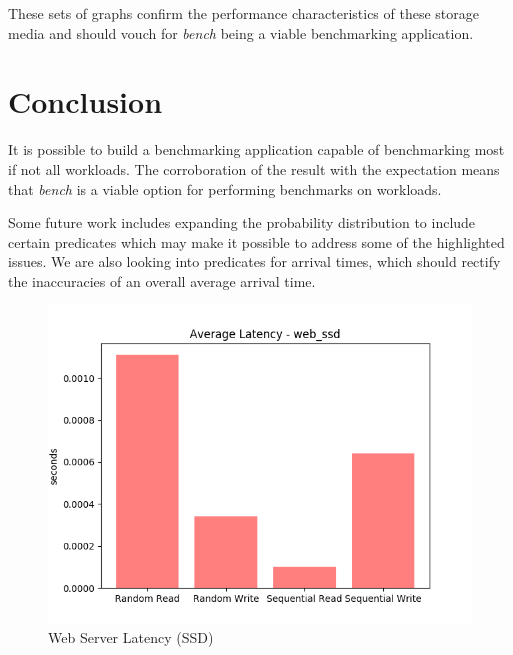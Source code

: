 \documentclass[10pt, author, twocolumn]{article}
\begin{document}
These sets of graphs confirm the performance characteristics of these storage media and should vouch for \textit{bench} being a viable benchmarking application.

\section{Conclusion}
It is possible to build a benchmarking application capable of benchmarking most if not all workloads. The corroboration of the result with the expectation means that \textit{bench} is a viable option for performing benchmarks on workloads. 

Some future work includes expanding the probability distribution to include certain predicates which may make it possible to address some of the highlighted issues. We are also looking into predicates for arrival times, which should rectify the inaccuracies of an overall average arrival time.

\newpage
\begin{figure}[t!]
    \includegraphics[scale=0.5]{../graphs/web_ssd-lat.png}
    \caption{Web Server Latency (SSD)}
    \label{fig:ssd_web_lat}
\end{figure}
\end{document}
